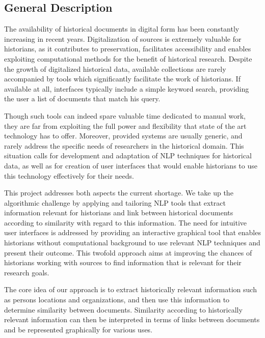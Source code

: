 \subsection{General Description}
\label{sec:general_description}
The availability of historical documents in digital form has been constantly increasing in recent years. 
Digitalization of sources is extremely valuable for historians, as it contributes to preservation, facilitates 
accessibility and enables exploiting computational methods for the benefit of historical research. Despite the growth 
of digitalized historical data, available collections are rarely accompanied by tools which significantly facilitate the 
work of historians. If available at all,  interfaces typically include a simple keyword search, providing the user a list 
of documents that match his query. 

Though such tools can indeed spare valuable time dedicated to manual work, 
they are far from exploiting the full power and flexibility that state of the art technology has to offer. 
Moreover, provided systems are usually generic, and rarely address the specific needs of researchers in the historical domain. 
This situation calls for development and adaptation of NLP techniques for historical data, as well as for creation of user interfaces 
that would enable historians to use this technology effectively for their needs. 

This project addresses both aspects the current shortage. We take up the algorithmic challenge by applying and tailoring NLP tools 
that extract information relevant for historians and link between historical documents according to similarity with regard to this information.
The need for intuitive user interfaces is addressed by providing an interactive graphical tool that enables historians without 
computational background to use relevant NLP techniques and present their outcome. This twofold approach aims at improving the chances of 
historians working with sources to find information that is relevant for their research goals.

The core idea of our approach is to extract historically relevant information such as persons locations and organizations,
and then use this information to determine similarity between documents. Similarity according to historically relevant information
can then be interpreted in terms of links between documents and be represented graphically for various uses.


